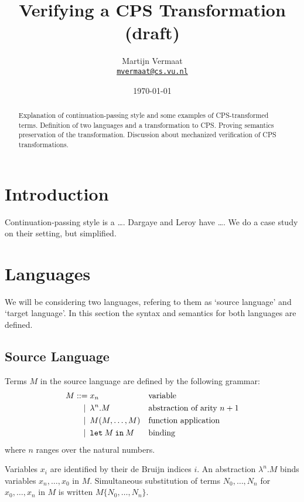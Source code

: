 \documentclass[a4paper,11pt,draft]{article}
\title{\sffamily Verifying a CPS Transformation (draft)}
\author{
  Martijn Vermaat\\[0.3em]
  \href{mailto:mvermaat@cs.vu.nl}{\texttt{mvermaat@cs.vu.nl}}
}
\date{\today}
\newcommand{\kw}[1]{\mathtt{#1}}
\begin{document}
\maketitle


\begin{abstract}
  Explanation of continuation-passing style and some examples of CPS-transformed
  terms. Definition of two languages and a transformation to CPS. Proving
  semantics preservation of the transformation. Discussion about mechanized
  verification of CPS transformations.
\end{abstract}


\section{Introduction}\label{sec:introduction}

Continuation-passing style is a \ldots. Dargaye and Leroy
\cite{Dargaye-Leroy-07} have \ldots. We do a case study on their setting, but
simplified.


\section{Languages}\label{sec:languages}

We will be considering two languages, refering to them as `source language' and
`target language'. In this section the syntax and semantics for both languages
are defined.

\subsection{Source Language}

Terms $M$ in the source language are defined by the following grammar:
\begin{align*}
M ::=             &\; x_{n}
                  && \text{variable} \\
\llap{\textbar\:} &\; \lambda^{n}.M
                  && \text{abstraction of arity $n+1$} \\
\llap{\textbar\:} &\; M(M, \ldots, M)
                  && \text{function application} \\
\llap{\textbar\:} &\; \kw{let} \: M \: \kw{in} \: M
                  && \text{binding}
\end{align*}
where $n$ ranges over the natural numbers.

Variables $x_{i}$ are identified by their de Bruijn indices $i$.
An abstraction $\lambda^{n}.M$ binds variables $x_{n}, \ldots, x_{0}$ in $M$.
Simultaneous substitution of terms $N_{0}, \ldots, N_{n}$ for
$x_{0}, \ldots, x_{n}$ in $M$ is written $M\{N_{0}, \ldots, N_{n}\}$.
\end{document}
